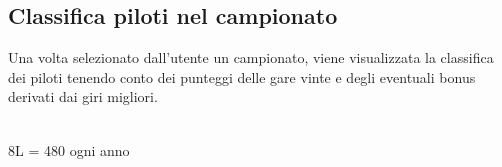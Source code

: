 \documentclass[a4paper,12pt]{report}
\begin{document}
			\subsection{Classifica piloti nel campionato}
			{\fontsize{12.5}{20}\selectfont
			Una volta selezionato dall'utente un campionato, viene visualizzata la classifica dei piloti
			tenendo conto dei punteggi delle gare vinte e degli eventuali bonus derivati dai giri migliori.}
			\begin{table}[!htb]
				\centering
				\begin{center}
				\newline\\
				8L = 480 ogni anno\\
				\end{center}
			\end{table}\\
\end{document}
